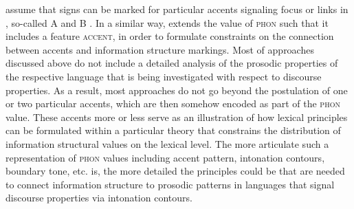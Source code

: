 \documentclass[output=paper
 	        ,biblatex
                ,babelshorthands
                ,newtxmath
                ,draftmode
                ,colorlinks, citecolor=brown
]{langscibook}
\begin{document}
\cite{EV96a} assume that signs can be marked for particular accents
signaling focus or links in , so-called A and B .
In a similar way, \cite{deKuthy2002a} extends the value of
 \textsc{phon} such that it includes a feature
 \textsc{accent}, in order to formulate constraints on
the connection between accents and information structure markings.
Most of approaches discussed above do not include a detailed analysis
of the prosodic properties of the respective language that is being
investigated with respect to discourse properties. As a result, most
approaches do not go beyond the postulation of one or two particular
accents, which are then somehow encoded as part of the \textsc{phon}
value. These accents more or less serve as an illustration of how lexical
principles can be formulated within a particular theory that constrains
the distribution of information structural values on the lexical
level. The more articulate such a representation of \textsc{phon}
values including accent pattern, intonation contours, boundary tone,
etc. is, the more detailed the principles could be that are needed to
connect information structure to prosodic patterns in languages that
signal discourse properties via intonation contours.
\end{document}
